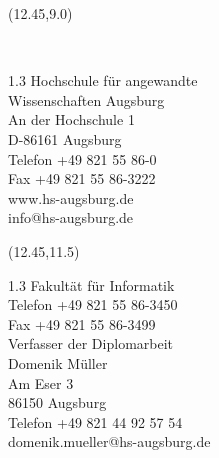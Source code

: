 \begin{textblock}{5}(12.45,9.0)
	\scriptsize
	\textcolor[rgb]{1,0,0}{\\
		\begin{flushleft}
			\begin{spacing} {1.3}
				Hochschule f\"ur angewandte\\
				Wissenschaften Augsburg\\
				\vspace{4pt}
				An der Hochschule 1\\
				D-86161 Augsburg\\
				\vspace{4pt}
				Telefon +49 821 55 86-0\\
				Fax +49 821 55 86-3222\\
				www.hs-augsburg.de\\
				info@hs-augsburg.de
			\end{spacing}
		\end{flushleft}
		}
\end{textblock}


\begin{textblock}{5}(12.45,11.5)
	\scriptsize
		\begin{flushleft}
			\begin{spacing} {1.3}
				Fakult\"at f\"ur Informatik\\
				Telefon +49 821 55 86-3450\\
				Fax \hspace{10pt} +49 821 55 86-3499\\
				\vspace{6pt}
				Verfasser der Diplomarbeit\\
				Domenik Müller\\
				Am Eser 3\\
				86150 Augsburg\\
				Telefon +49 821 44 92 57 54\\
				domenik.mueller@hs-augsburg.de\\
			\end{spacing}
		\end{flushleft}
	\end{textblock}
\pagebreak
